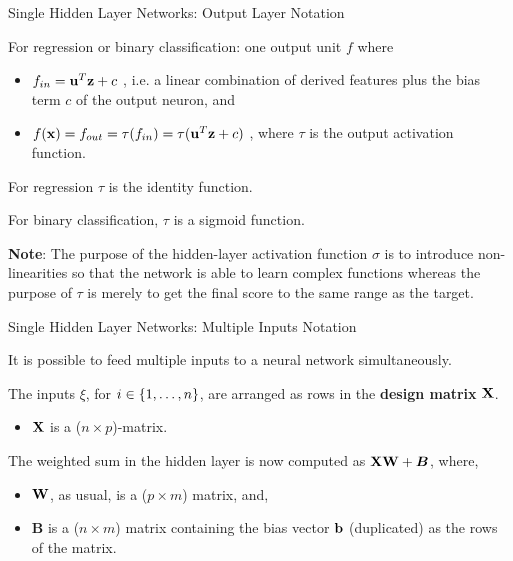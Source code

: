 \documentclass[11pt,compress,t,notes=noshow, xcolor=table]{beamer}
\begin{document}
\begin{framei}{Single Hidden Layer Networks: Output Layer Notation}

    \item For regression or binary classification: one output unit $f$ where
      \begin{itemize}
        \item $f_{in} = \mathbf{u}^T \mathbf{z} + c$ , i.e. a linear combination of derived features plus the bias term $c$ of the output neuron, and

        \item $f(\mathbf{x})= f_{out} = \tau(f_{in}) = \tau(\mathbf{u}^T \mathbf{z} + c)$ , where $\tau$ is the output activation function.
      \end{itemize}
    \item For regression $\tau$ is the identity function.
    \item For binary classification, $\tau$ is a sigmoid function.
    \item \textbf{Note}: The purpose of the hidden-layer activation function $\sigma$ is to introduce non-linearities so that the network is able to learn complex functions whereas the purpose of $\tau$ is merely to get the final score to the same range as the target.
\end{framei}

\begin{framei}{Single Hidden Layer Networks: Multiple Inputs Notation}

    \item It is possible to feed multiple inputs to a neural network simultaneously.

    \item The inputs $\xi$, for $i \in \{1, \ldots, n\}$, are arranged as rows in the \textbf{design matrix} $\mathbf{X}$.
    \begin{itemize}
      \item $\mathbf{X}$ is a ($n \times p$)-matrix.
    \end{itemize}

    \item The weighted sum in the hidden layer is now computed as $\mathbf{X}\mathbf{W} + \bm{B}$, where,
      \begin{itemize}
        \item $\mathbf{W}$, as usual, is a ($p \times m$) matrix, and,

        \item $\bm{B}$ is a ($n \times m$) matrix containing the bias vector $\mathbf{b}$ (duplicated) as the rows of the matrix.
      \end{itemize}

\end{framei}    
\end{document}
